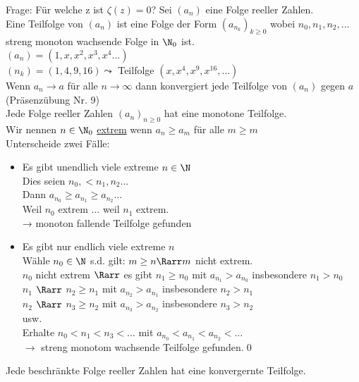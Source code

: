 Frage: Für welche z ist $\zeta(z)=0$?
%
Sei $(a_n)$ eine Folge reeller Zahlen.\\
Eine Teilfolge von $(a_n)$ ist eine Folge der Form $(a_{n_k})_{k \geq 0}$ wobei $n_0, n_1, n_2,...$ streng monoton wachsende Folge in $\N_0$ ist.\\
\bsp
$(a_n) = (1, x, x^2, x^3 , x^4 ...)$\\
$(n_k) = (1, 4, 9, 16) \leadsto $ Teilfolge $(x, x^4, x^9, x^{16} ,…)$\\
Wenn $a_n \to a$ für alle $n \to \infty$ dann konvergiert jede Teilfolge von $(a_n)$ gegen $a$ (Präsenzübung Nr. 9)\\
%
Jede Folge reeller Zahlen $(a_n)_{n\geq 0}$ hat eine monotone Teilfolge.\\
%
\bew
Wir nennen $n\in \N_0$ \underline{extrem} wenn $a_n \geq a_m$ für alle $m \geq m$\\
Unterscheide zwei Fälle:\\
\begin{itemize}
    \item{Es gibt unendlich viele extreme $n \in \N$\\
Dies seien $n_0, < n_1, n_2...$\\
Dann $a_{n_0} \geq a_{n_1} \geq a_{n_2} …$\\
Weil $n_0$ extrem ... weil $n_1$ extrem.\\
→ monoton fallende Teilfolge gefunden}
    \item{Es gibt nur endlich viele extreme $n$\\
Wähle $n_0 \in \N$ s.d. gilt: $m \geq n \Rarr m$ nicht extrem.\\
$n_0$ nicht extrem $\Rarr$ es gibt $n_1 \geq n_0$ mit $a_{n_1} > a_{n_0}$ insbesondere $n_1 > n_0$\\
$n_1$ \phantom{nicht extrem }$\Rarr$ \phantom{es gibt }$n_2 \geq n_1$ mit $a_{n_2} > a_{n_1}$ insbesondere $n_2 > n_1$\\
$n_2$ \phantom{nicht extrem }$\Rarr$ \phantom{es gibt }$n_3 \geq n_2$ mit $a_{n_3} > a_{n_2}$ insbesondere $n_3 > n_2$\\
usw.\\
Erhalte $n_0 < n_1 < n_3 < …$ mit $a_{n_0} < a_{n_1} < a_{n_2} < …$ \\
$\to $ streng monotom wachsende Teilfolge gefunden.\qed
}
\end{itemize}
Jede beschränkte Folge reeller Zahlen hat eine konvergernte Teilfolge.\\
